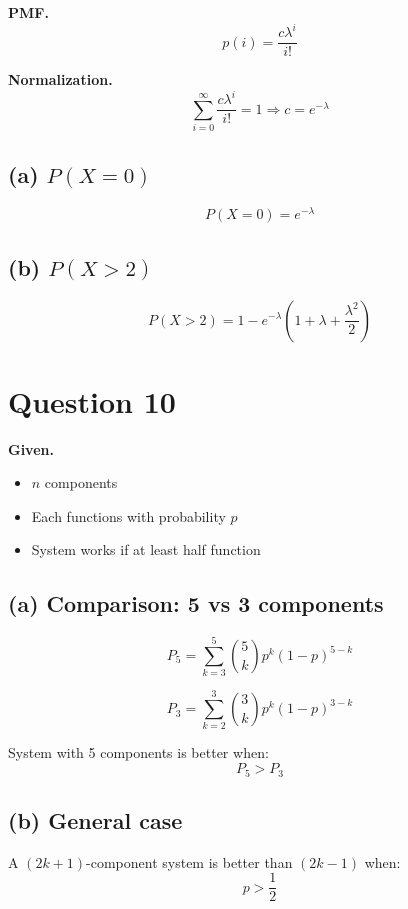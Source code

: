 \documentclass[12pt]{article}
\begin{document}
\textbf{PMF.}
\[
p(i) = \frac{c\lambda^i}{i!}
\]

\textbf{Normalization.}
\[
\sum_{i=0}^{\infty} \frac{c\lambda^i}{i!} = 1
\Rightarrow c = e^{-\lambda}
\]

\subsection*{(a) $P(X=0)$}

\[
P(X=0) = e^{-\lambda}
\]

\subsection*{(b) $P(X>2)$}

\[
P(X>2) = 1 - e^{-\lambda}\left(1 + \lambda + \frac{\lambda^2}{2}\right)
\]

\section*{Question 10}

\textbf{Given.}
\begin{itemize}
\item $n$ components
\item Each functions with probability $p$
\item System works if at least half function
\end{itemize}

\subsection*{(a) Comparison: 5 vs 3 components}

\[
P_5 = \sum_{k=3}^{5} \binom{5}{k} p^k (1-p)^{5-k}
\]

\[
P_3 = \sum_{k=2}^{3} \binom{3}{k} p^k (1-p)^{3-k}
\]

System with 5 components is better when:
\[
P_5 > P_3
\]

\subsection*{(b) General case}

A $(2k+1)$-component system is better than $(2k-1)$ when:
\[
p > \frac{1}{2}
\]
\end{document}
